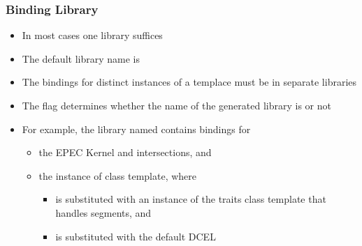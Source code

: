 \begin{frame}
  \frametitle{Binding Library}
  \begin{itemize}
  \item In most cases one library suffices
  \item The default library name is 
  \item The bindings for distinct instances of a templace must be in separate
    libraries
  \item The \cmake{} flag  determines
    whether the name of the generated library is  or not
  \item For example, the library named
     contains bindings for
    \begin{itemize}
      \item the EPEC Kernel and intersections, and
      \item the instance of 
        class template, where
        \begin{itemize}
        \item {} is substituted with
          an instance of the traits class template that handles segments, and
        \item {} is substituted with the default DCEL
        \end{itemize}
    \end{itemize}
  \end{itemize}
\end{frame}
